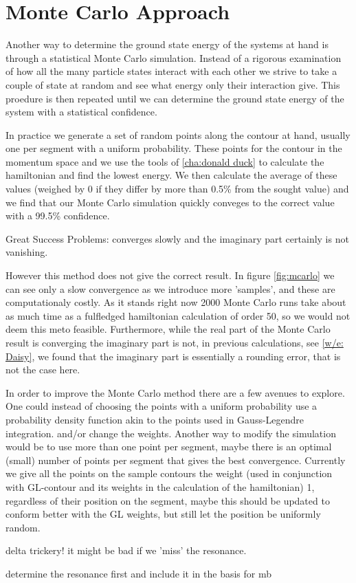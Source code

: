 \chapter{Monte Carlo Approach}
\label{cha:monte carlo}

Another way to determine the ground state energy of the systems at hand is through a statistical Monte Carlo simulation. 
Instead of a rigorous examination of how all the many particle states interact with each other we strive to take a couple of state at random and see what energy only their interaction give. 
This proedure is then repeated until we can determine the ground state energy of the system with a statistical confidence.

In practice we generate a set of random points along the contour at hand, usually one per segment with a uniform probability. 
These points for the contour in the momentum space and we use the tools of \cref{cha:donald duck} to calculate the hamiltonian and find the lowest energy. 
We then calculate the average of these values (weighed by 0 if they differ by more than 0.5\% from the sought value) and we find that our Monte Carlo simulation quickly conveges to the correct value with a 99.5\% confidence.

Great Success
Problems: converges slowly and the imaginary part certainly is not vanishing.



However this method does not give the correct result. 
In figure \cref{fig:mcarlo} we can see only a slow convergence as we introduce more 'samples', and these are computationaly costly. 
As it stands right now 2000 Monte Carlo runs take about as much time as a fulfledged hamiltonian calculation of order 50, so we would not deem this meto feasible.
Furthermore, while the real part of the Monte Carlo result is converging the imaginary part is not, in previous calculations, see \cref{w/e: Daisy}, we found that the imaginary part is essentially a rounding error, that is not the case here.

In order to improve the Monte Carlo method there are a few avenues to explore.
One could instead of choosing the points with a uniform probability use a probability density function akin to the points used in Gauss-Legendre integration. 
and/or change the weights.
Another way to modify the simulation would be to use more than one point per segment, maybe there is an optimal (small) number of points per segment that gives the best convergence. 
Currently we give all the points on the sample contours the weight (used in conjunction with GL-contour and its weights in the calculation of the hamiltonian) 1, regardless of their position on the segment, maybe this should be updated to conform better with the GL weights, but still let the position be uniformly random.

delta trickery! it might be bad if we 'miss' the resonance.

determine the resonance first and include it in the basis for mb